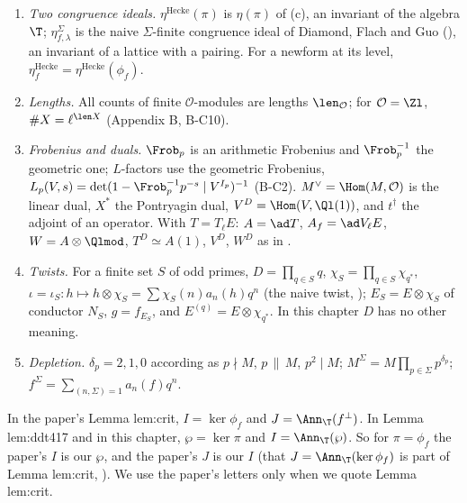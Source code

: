 \begin{convention}
\begin{enumerate}[label=(\alph*)]
\item \emph{Two congruence ideals.} $\eta^{\mathrm{Hecke}}(\pi)$ is $\eta(\pi)$ of (c), an invariant of the algebra $\T$; $\eta^\Sigma_{f,\lambda}$ is the naive $\Sigma$-finite congruence ideal of
Diamond, Flach and Guo (), an invariant of a lattice with a pairing. For a newform at its level, $\eta^{\mathrm{Hecke}}_f=\eta^{\mathrm{Hecke}}(\phi_f)$.
\item \emph{Lengths.} All counts of finite $\mathcal O$-modules are lengths $\len_{\mathcal O}$; for $\mathcal O=\Zl$, $\#X=\ell^{\len X}$ (Appendix B, B-C10).
\item \emph{Frobenius and duals.} $\Frob_p$ is an arithmetic Frobenius and $\Frob_p^{-1}$ the geometric one; $L$-factors use the geometric Frobenius,
$L_p(V,s)=\det(1-\Frob_p^{-1}p^{-s}\mid V^{I_p})^{-1}$ (B-C2). $M^\vee=\Hom(M,\mathcal O)$ is the linear dual, $X^*$ the Pontryagin dual, $V^D=\Hom(V,\Ql(1))$, and $t^\dagger$ the
adjoint of an operator. With $T=T_\ell E$: $A=\ad T$, $A_f=\ad V_\ell E$, $W=A\otimes\Qlmod$, $T^D\simeq A(1)$, $V^D$, $W^D$ as in .
\item \emph{Twists.} For a finite set $S$ of odd primes, $D=\prod_{q\in S}q$, $\chi_S=\prod_{q\in S}\chi_{q^*}$, $\iota=\iota_S\colon h\mapsto h\otimes\chi_S=\sum\chi_S(n)a_n(h)q^n$ (the naive twist,
); $E_S=E\otimes\chi_S$ of conductor $N_S$, $g=f_{E_S}$, and $E^{(q)}=E\otimes\chi_{q^*}$. In this chapter $D$ has no other meaning.
\item \emph{Depletion.} $\delta_p=2,1,0$ according as $p\nmid M$, $p\,\|\,M$, $p^2\mid M$; $M^\Sigma=M\prod_{p\in\Sigma}p^{\delta_p}$; $f^\Sigma=\sum_{(n,\Sigma)=1}a_n(f)q^n$.
\end{enumerate}
\end{convention}

\begin{warning}\label{warn:congruence:letters}
In the paper's Lemma lem:crit, $I=\ker\phi_f$ and $J=\Ann_\T(f^\perp)$. In Lemma lem:ddt417 and in this chapter, $\wp=\ker\pi$ and $I=\Ann_\T(\wp)$. So for $\pi=\phi_f$ the paper's
$I$ is our $\wp$, and the paper's $J$ is our $I$ (that $J=\Ann_\T(\ker\phi_f)$ is part of Lemma lem:crit, ). We use the paper's letters only when we
quote Lemma lem:crit.
\end{warning}


